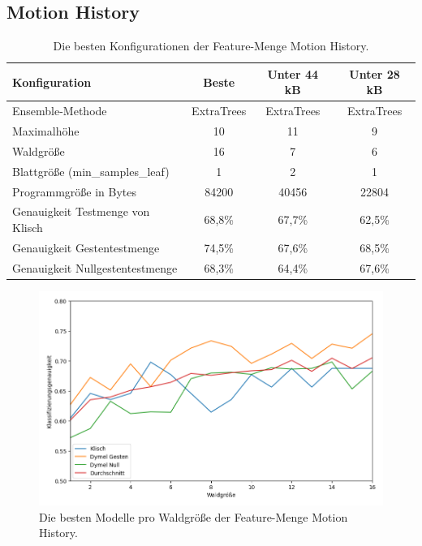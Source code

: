 \subsection{Motion History}
\begin{table}[h!]
    \centering
    \begin{tabular}{ | l | c | c | c |}
        \hline
        Konfiguration & Beste & Unter 44 kB & Unter 28 kB \\\hline
        Ensemble-Methode & ExtraTrees & ExtraTrees & ExtraTrees \\\hline
        Maximalhöhe & 10 & 11 & 9 \\\hline
        Waldgröße & 16 & 7 & 6 \\\hline
        Blattgröße (min\_samples\_leaf) & 1 & 2 & 1 \\\hline
        Programmgröße in Bytes & 84200 & 40456 & 22804 \\\hline
        Genauigkeit Testmenge von Klisch & 68,8\% & 67,7\% & 62,5\% \\\hline
        Genauigkeit Gestentestmenge & 74,5\% & 67,6\% & 68,5\% \\\hline
        Genauigkeit Nullgestentestmenge & 68,3\% & 64,4\% & 67,6\% \\\hline
    \end{tabular}
    \caption{Die besten Konfigurationen der Feature-Menge Motion History.}
    \label{tab:motion_history}
\end{table}
\begin{figure}[h!]
    \centering
    \includegraphics[width=\linewidth]{images/motion_history_acc_per_size.png}
    \caption{Die besten Modelle pro Waldgröße der Feature-Menge Motion History.}
    \label{fig:motion_history_per_forest_size}
\end{figure}
